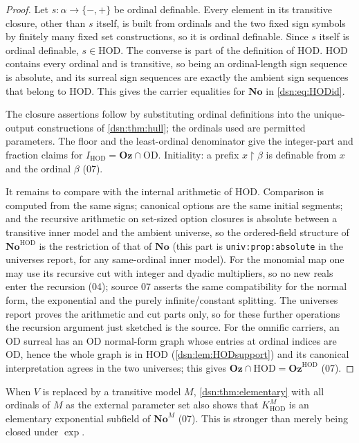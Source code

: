\documentclass[11pt,a4paper]{article}
\numberwithin{equation}{section}
\theoremstyle{definition}
\theoremstyle{remark}
\newcommand{\No}{\mathbf{No}}
\newcommand{\Oz}{\mathbf{Oz}}
\newcommand{\OD}{\mathrm{OD}}
\newcommand{\HOD}{\mathrm{HOD}}
\newcommand{\KH}{K_{\HOD}}
\newcommand{\IH}{I_{\HOD}}
\newcommand{\res}{\mathbin{\upharpoonright}}
\newcommand{\lbl}[1]{\nolinkurl{#1}}
\begin{document}
\begin{proof}
Let $s:\alpha\to\{-,+\}$ be ordinal definable. Every element in its
transitive closure, other than $s$ itself, is built from ordinals and the
two fixed sign symbols by finitely many fixed set constructions, so it is
ordinal definable. Since $s$ itself is ordinal definable, $s\in\HOD$.
The converse is part of the definition of $\HOD$. $\HOD$ contains every
ordinal and is transitive, so being an ordinal-length sign sequence is
absolute, and its surreal sign sequences are exactly the ambient sign
sequences that belong to $\HOD$. This gives the carrier equalities for
$\No$ in \eqref{dsn:eq:HODid}.

The closure assertions follow by substituting ordinal definitions into the
unique-output constructions of \cref{dsn:thm:hull}; the ordinals used are
permitted parameters. The floor and the least-ordinal denominator give the
integer-part and fraction claims for $\IH=\Oz\cap\OD$. Initiality: a prefix
$x\res\beta$ is definable from $x$ and the ordinal $\beta$ (07).

It remains to compare with the internal arithmetic of $\HOD$. Comparison is
computed from the same signs; canonical options are the same initial
segments; and the recursive arithmetic on set-sized option closures is
absolute between a transitive inner model and the ambient universe, so the
ordered-field structure of $\No^{\HOD}$ is the restriction of that of $\No$
(this part is \lbl{univ:prop:absolute} in the universes report, for any
same-ordinal inner model). For the monomial map one may use its recursive
cut with integer and dyadic multipliers, so no new reals enter the
recursion (04); source 07 asserts the same compatibility for the normal
form, the exponential and the purely infinite/constant splitting. The
universes report proves the arithmetic and cut parts only, so for these
further operations the recursion argument just sketched is the source.
For the omnific carriers, an $\OD$ surreal has an $\OD$ normal-form graph
whose entries at ordinal indices are $\OD$, hence the whole graph is in
$\HOD$ (\cref{dsn:lem:HODsupport}) and its canonical interpretation agrees
in the two universes; this gives $\Oz\cap\HOD=\Oz^{\HOD}$ (07).
\end{proof}

When $V$ is replaced by a transitive model $M$, \cref{dsn:thm:elementary}
with all ordinals of $M$ as the external parameter set also shows that
$\KH^M$ is an elementary exponential subfield of $\No^M$ (07). This is
stronger than merely being closed under $\exp$.
\end{document}
